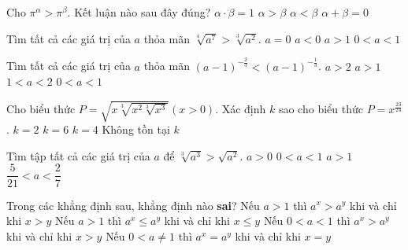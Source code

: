 \begin{ex}%
	Cho $\pi^{\alpha}>\pi^{\beta}$. Kết luận nào sau đây đúng?
	\choice
	{$\alpha\cdot\beta=1$}
	{\True $\alpha>\beta$}
	{$\alpha<\beta$}
	{$\alpha+\beta=0$}
\end{ex}
\begin{ex}%
	Tìm tất cả các giá trị của $a$ thỏa mãn $\sqrt[4]{a^7}>\sqrt[3]{a^2}$. 
	\choice
	{$a=0$}
	{$a<0$}
	{\True $a>1$}
	{$0<a<1$}
\end{ex}
\begin{ex}%
	Tìm tất cả các giá trị của $a$ thỏa mãn $(a-1)^{-\tfrac{2}{3}}<(a-1)^{-\tfrac{1}{3}}$. 
	\choice
	{$a>2$}
	{$a>1$}
	{\True $1<a<2$}
	{$0<a<1$}
\end{ex}
\begin{ex}%
	Cho biểu thức $P=\sqrt{x\sqrt[3]{x^2\sqrt[3]{x^3}}} (x>0)$. Xác định $k$ sao cho biểu thức $P=x^{\tfrac{23}{24}}$. 
	\choice
	{$k=2$}
	{$k=6$}
	{\True $k=4$}
	{Không tồn tại $k$}
\end{ex}
\begin{ex}%
	Tìm tập tất cả các giá trị của $a$ để $\sqrt[3]{a^3}>\sqrt{a^2}$.
	\choice
	{$a>0$}
	{\True $0<a<1$}
	{$a>1$}
	{$\dfrac{5}{21}<a<\dfrac{2}{7}$}
\end{ex}
\begin{ex}%
	Trong các khẳng định sau, khẳng định nào \textbf{sai}? 
	\choice
	{Nếu $a>1$ thì $a^x>a^y$ khi và chỉ khi $x>y$}
	{Nếu $a>1$ thì $a^x\leq a^y$ khi và chỉ khi $x\leq y$}
	{\True Nếu $0<a<1$ thì $a^x>a^y$ khi và chỉ khi $x>y$}
	{Nếu $0<a\neq 1$ thì $a^x=a^y$ khi và chỉ khi $x=y$}
\end{ex}
